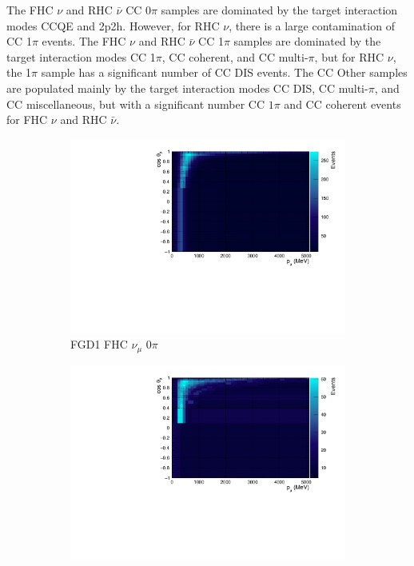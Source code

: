 The FHC $\nu$ and RHC $\bar{\nu}$ CC 0$\pi$ samples are dominated by the target interaction modes CCQE and 2p2h. However, for RHC $\nu$, there is a large contamination of CC 1$\pi$ events. The FHC $\nu$ and RHC $\bar{\nu}$ CC 1$\pi$ samples are dominated by the target interaction modes CC 1$\pi$, CC coherent, and CC multi-$\pi$, but for RHC $\nu$, the 1$\pi$ sample has a significant number of CC DIS events. The CC Other samples are populated mainly by the target interaction modes CC DIS, CC multi-$\pi$, and CC miscellaneous, but with a significant number CC $1\pi$ and CC coherent events for FHC $\nu$ and RHC $\bar{\nu}$.

\begin{figure}[!htbp]
\centering
\begin{subfigure}{.32\textwidth}
  \centering
  \includegraphics[width=0.95\linewidth]{figs/TH2PolyNom_MC_FGD1_numuCC_0pi}
  \caption{FGD1 FHC $\nu_{\mu}$ 0$\pi$}
  \label{fig:th2polynomFGD1_numuCC_0pi}
\end{subfigure}
\begin{subfigure}{.32\textwidth}
  \centering
  \includegraphics[width=0.95\linewidth]{figs/TH2PolyNom_MC_FGD1_numuCC_1pi}

\end{subfigure}
\end{figure}

